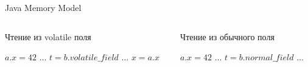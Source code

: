 \documentclass[usenames,dvipsnames,pdftex,unicode]{beamer}
\newcommand{\eng}[1]{{\English#1}}
\begin{document}
\begin{frame}{Java Memory Model}
  \begin{columns}[t]
    \begin{column}{5cm}
      \begin{block}{Чтение из \eng{volatile} поля}
        \begin{algorithmic}
          \STATE $a.x = 42$
          \STATE $\ldots$
          \STATE $t = b.volatile\_field$
          \STATE $\ldots$
          \STATE $x = a.x$
        \end{algorithmic}
      \end{block}
    \end{column}
    \begin{column}{5cm}
      \begin{block}{Чтение из обычного поля}
        \begin{algorithmic}
          \STATE $a.x = 42$
          \STATE $\ldots$
          \STATE $t = b.normal\_field$
          \STATE $\ldots$
          \STATE {}
        \end{algorithmic}
      \end{block}
    \end{column}
  \end{columns}
\end{frame}
\end{document}
